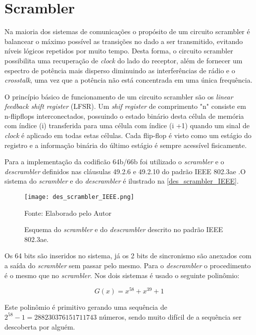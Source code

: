 \section{Scrambler} \label{scramb:64b66b}

Na maioria dos sistemas de comunicações o propósito de um circuito scrambler é balancear o máximo possível as transições no dado a ser transmitido, evitando níveis lógicos repetidos por muito tempo. Desta forma, o circuito scrambler possibilita uma recuperação de \textit{clock} do lado do receptor, além de fornecer um espectro de potência mais disperso diminuindo as interferências de rádio e o \textit{crosstalk}, uma vez que a potência não está concentrada em uma única frequência.

O princípio básico de funcionamento de um circuito scrambler são os \textit{linear feedback shift register} (LFSR). Um \textit{shif register} de comprimento "n" consiste em n-flipflops interconectados, possuindo o estado binário desta célula de memória com índice (i) transferida para uma célula com índice (i +1) quando um sinal de \textit{clock} é aplicado em todas estas células. Cada flip-flop é visto como um estágio do registro e a informação binária do último estágio é sempre acessível fisicamente.

Para a implementação da codificão 64b/66b foi utilizado o \textit{scrambler} e o \textit{descrambler} definidos nas cláusulas 49.2.6 e 49.2.10 do padrão IEEE 802.3ae \cite{IEEstandard}.O sistema do \textit{scrambler} e do \textit{descrambler} é ilustrado na \autoref{des_scrambler_IEEE}.

\begin{figure}[H]
	\caption{\label{des_scrambler_IEEE} Esquema do \textit{scrambler} e do \textit{descrambler} descrito no padrão IEEE 802.3ae.}
	\centering
	\texttt{[image: des\_scrambler\_IEEE.png]}
	\begin{center}
		Fonte: Elaborado pelo Autor
	\end{center}	
\end{figure}

Os 64 bits são inseridos no sistema, já os 2 bits de sincronismo são anexados com a saída do \textit{scrambler} sem passar pelo mesmo. Para o \textit{descrambler} o procedimento é o mesmo que no \textit{scrambler}. Nos dois sistemas é usado o seguinte polinômio:

$$ G(x) = x^{58} + x^{39} + 1 $$

Este polinômio é primitivo gerando uma sequência de $2^{58} - 1 = 288230376151711743$ números, sendo muito difícil de a sequência ser descoberta por alguém. 

